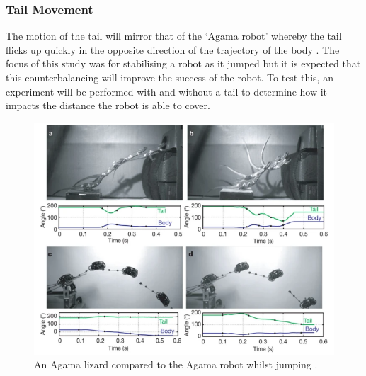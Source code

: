 \documentclass{article}
\begin{document}
\newpage
\subsubsection{Tail Movement}
\label{sec:Tail Movement}
The motion of the tail will mirror that of the ‘Agama robot’ whereby the tail flicks up quickly in the opposite direction of the trajectory of the body . The focus of this study was for stabilising a robot as it jumped but it is expected that this counterbalancing  will improve the success of the robot. To test this, an experiment will be performed with and without a tail to determine how it impacts the distance the robot is able to cover. 
\begin{figure}[H]
\centering
\includegraphics[scale=0.6]{agamaJump}
\caption{An Agama lizard compared to the Agama robot whilst jumping \citep{agama}.}
\end{figure}
\end{document}
